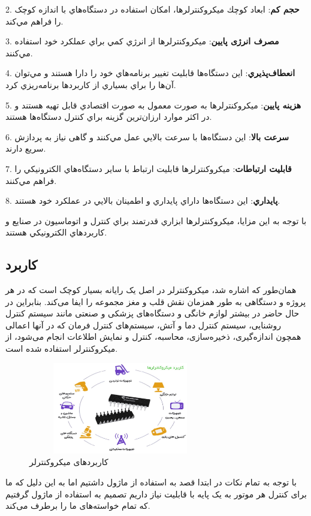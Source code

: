 2. \textbf{حجم کم}: ابعاد كوچك ميكروكنترلرها، امكان استفاده در دستگاه‌هاي با اندازه کوچک را فراهم مي‌كند.

3. \textbf{مصرف انرژی پایین}: ميكروكنترلرها از انرژي كمي براي عملكرد خود استفاده مي‌كنند.

4. \textbf{انعطاف‌پذيري}: اين دستگاه‌ها قابليت تغيير برنامه‌هاي خود را دارا هستند و مي‌توان آن‌ها را براي بسياري از كاربردها برنامه‌ريزي كرد.

5. \textbf{هزينه پايين}: ميكروكنترلرها به صورت معمول به صورت اقتصادي قابل تهيه هستند و در اكثر موارد ارزان‌ترين گزينه براي كنترل دستگاه‌ها هستند.

6. \textbf{سرعت بالا}: اين دستگاه‌ها با سرعت بالايي عمل مي‌كنند و گاهی نياز به پردازش سريع دارند.

7. \textbf{قابليت ارتباطات}: ميكروكنترلرها قابليت ارتباط با ساير دستگاه‌هاي الكترونيكي را فراهم مي‌كنند.

8. \textbf{پايداري}: اين دستگاه‌ها داراي پايداري و اطمينان بالايي در عملكرد خود هستند.

با توجه به اين مزايا، ميكروكنترلرها ابزاري قدرتمند براي كنترل و اتوماسيون در صنايع و كاربردهاي الكترونيكي هستند.

\subsection{کاربرد}
همان‌طور که اشاره شد، میکروکنترلر در اصل یک رایانه بسیار کوچک است که در هر پروژه و دستگاهی به طور همزمان نقش قلب و مغز مجموعه را ایفا می‌کند. بنابراین در حال حاضر در بیشتر لوازم خانگی و دستگاه‌های پزشکی و صنعتی مانند سیستم کنترل روشنایی، سیستم کنترل دما و آتش، سیستم‌های کنترل فرمان که در آنها اعمالی همچون اندازه‌گیری، ذخیره‌سازی، محاسبه، کنترل و نمایش اطلاعات انجام می‌شود، از میکروکنترلر استفاده شده است. 
    \begin{figure}[!h]
	\centering
	\includegraphics[height=4cm,width=8cm]{./Images/CH3/Micro_Uses.JPG}
	\caption[کاربردهای میکروکنترلر]{کاربردهای میکروکنترلر\cite{Micro}}
	\label{کاربرد میکرو}
	\end{figure}

با توجه به تمام نکات در ابتدا قصد به استفاده از ماژول  داشتیم اما به این دلیل که ما برای کنترل هر موتور به یک پایه با قابلیت  نیاز داریم تصمیم به استفاده از ماژول  گرفتیم که تمام خواسته‌های ما را برطرف می‌کند.
